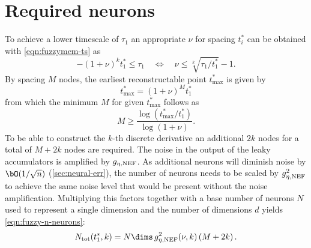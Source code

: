 \section{Required neurons}\label{apdx:fuzzymem-neurons}
To achieve a lower timescale of $\tau_1$ an appropriate $\nu$ for spacing $t^*_i$ can be obtained with \cref{eqn:fuzzymem-ts} as
\begin{equation}
    -{(1+\nu)}^k t^*_1 \leq \tau_1 \quad\Leftrightarrow\quad \nu \leq \sqrt[k]{\tau_1 / t^*_1} - 1 \text{.}
\end{equation}
By spacing $M$ nodes, the earliest reconstructable point $t^*_{\max}$ is given by
\begin{equation}
    t^*_{\max} = {(1+\nu)}^M t^*_1
\end{equation}
from which the minimum $M$ for given $t^*_{\max}$ follows as
\begin{equation}
    M \geq \frac{\log(t^*_{\max} / t^*_1)}{\log(1+\nu)} \text{.}
\end{equation}
To be able to construct the $k$-th discrete derivative an additional $2k$ nodes for a total of $M + 2k$ nodes are required.
The noise in the output of the leaky accumulators is amplified by $g_{\eta,{\mathrm{NEF}}}$.
As additional neurons will diminish noise by $\bO(1/\sqrt{n})$ (\cref{sec:neural-err}), the number of neurons needs to be scaled by $g_{\eta,{\mathrm{NEF}}}^2$ to achieve the same noise level that would be present without the noise amplification.
Multiplying this factors together with a base number of neurons $N$ used to represent a single dimension and the number of dimensions $d$ yields \cref{eqn:fuzzy-n-neurons}:
\begin{equation*}
    N_{\ped{tot}}(t^*_1, k) = N \dims\, g_{\eta,\ped{NEF}}^2(\nu, k) \del{M + 2k} \text{.}
\end{equation*}
